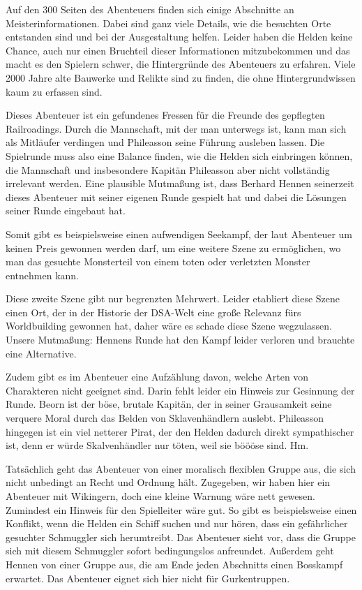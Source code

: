 \documentclass[final]{multiversum}
\begin{document}
Auf den 300 Seiten des Abenteuers finden sich einige Abschnitte an
Meisterinformationen. Dabei sind ganz viele Details, wie die besuchten Orte
entstanden sind und bei der Ausgestaltung helfen. Leider haben die Helden keine
Chance, auch nur einen Bruchteil dieser Informationen mitzubekommen und das
macht es den Spielern schwer, die Hintergründe des Abenteuers zu erfahren. Viele
2000 Jahre alte Bauwerke und Relikte sind zu finden, die ohne Hintergrundwissen
kaum zu erfassen sind.

Dieses Abenteuer ist ein gefundenes Fressen für die Freunde des gepflegten
Railroadings. Durch die Mannschaft, mit der man unterwegs ist, kann man sich als
Mitläufer verdingen und Phileasson seine Führung ausleben lassen. Die Spielrunde
muss also eine Balance finden, wie die Helden sich einbringen können, die
Mannschaft und insbesondere Kapitän Phileasson aber nicht vollständig irrelevant
werden. Eine plausible Mutmaßung ist, dass Berhard Hennen seinerzeit dieses
Abenteuer mit seiner eigenen Runde gespielt hat und dabei die Lösungen seiner
Runde eingebaut hat.

Somit gibt es beispielsweise einen aufwendigen Seekampf, der laut Abenteuer um
keinen Preis gewonnen werden darf, um eine weitere Szene zu ermöglichen, wo man
das gesuchte Monsterteil von einem toten oder verletzten Monster entnehmen kann.

Diese zweite Szene gibt nur begrenzten Mehrwert. Leider etabliert diese Szene
einen Ort, der in der Historie der DSA-Welt eine große Relevanz fürs
Worldbuilding gewonnen hat, daher wäre es schade diese Szene wegzulassen. Unsere
Mutmaßung: Hennens Runde hat den Kampf leider verloren und brauchte eine
Alternative.

Zudem gibt es im Abenteuer eine Aufzählung davon, welche Arten von Charakteren
nicht geeignet sind. Darin fehlt leider ein Hinweis zur Gesinnung der Runde.
Beorn ist der böse, brutale Kapitän, der in seiner Grausamkeit seine verquere
Moral durch das Belden von Sklavenhändlern auslebt. Phileasson hingegen ist ein
viel netterer Pirat, der den Helden dadurch direkt sympathischer ist, denn er
würde Skalvenhändler nur töten, weil sie böööse sind. Hm.

Tatsächlich geht das Abenteuer von einer moralisch flexiblen Gruppe aus, die
sich nicht unbedingt an Recht und Ordnung hält. Zugegeben, wir haben hier ein
Abenteuer mit Wikingern, doch eine kleine Warnung wäre nett gewesen. Zumindest
ein Hinweis für den Spielleiter wäre gut. So gibt es beispielsweise einen
Konflikt, wenn die Helden ein Schiff suchen und nur hören, dass ein gefährlicher
gesuchter Schmuggler sich herumtreibt. Das Abenteuer sieht vor, dass die Gruppe
sich mit diesem Schmuggler sofort bedingungslos anfreundet. Außerdem geht Hennen
von einer Gruppe aus, die am Ende jeden Abschnitts einen Bosskampf erwartet. Das
Abenteuer eignet sich hier nicht für Gurkentruppen.
\end{document}
